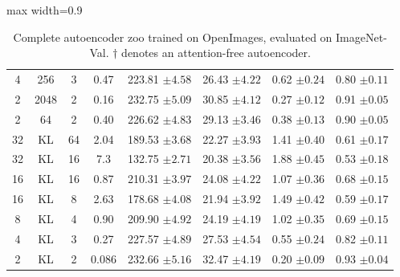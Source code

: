 {\begin{table}[thbp]
\begin{center}
\begin{footnotesize}
\begin{adjustbox}{max width=0.9\textwidth}
\begin{tabular}{c c c c c c c c}
%
%
%
%
 4 & 256 & 3 & 0.47 & 223.81 \tiny{$\pm4.58$} & 26.43 \tiny{$\pm4.22$} & 0.62 \tiny{$\pm0.24$} & 0.80 \tiny{$\pm0.11$} \\
2 & 2048 & 2 & 0.16 & 232.75 \tiny{$\pm5.09$} & 30.85 \tiny{$\pm4.12$} & 0.27 \tiny{$\pm0.12$} & 0.91 \tiny{$\pm0.05$} \\
2 & 64 & 2 & 0.40 & 226.62 \tiny{$\pm4.83$} & 29.13 \tiny{$\pm3.46$} & 0.38 \tiny{$\pm0.13$} & 0.90 \tiny{$\pm0.05$} \\
\midrule
32 & KL & 64 & 2.04 & 189.53 \tiny{$\pm3.68$} & 22.27 \tiny{$\pm3.93$} & 1.41 \tiny{$\pm0.40$} & 0.61 \tiny{$\pm0.17$} \\
32 & KL & 16 & 7.3 & 132.75 \tiny{$\pm2.71$} & 20.38 \tiny{$\pm3.56$} & 1.88 \tiny{$\pm0.45$} & 0.53 \tiny{$\pm0.18$} \\
16 & KL & 16 & 0.87 & 210.31 \tiny{$\pm3.97$} & 24.08 \tiny{$\pm4.22$} & 1.07 \tiny{$\pm0.36$} & 0.68 \tiny{$\pm0.15$} \\
16 & KL & 8 & 2.63 & 178.68 \tiny{$\pm4.08$} & 21.94 \tiny{$\pm3.92$} & 1.49 \tiny{$\pm0.42$} & 0.59 \tiny{$\pm0.17$} \\
8  & KL & 4 & 0.90 & 209.90 \tiny{$\pm4.92$} & 24.19 \tiny{$\pm4.19$} & 1.02 \tiny{$\pm0.35$} & 0.69 \tiny{$\pm0.15$} \\
4  & KL & 3 & 0.27 & 227.57 \tiny{$\pm4.89$} & 27.53 \tiny{$\pm4.54$} & 0.55 \tiny{$\pm0.24$} & 0.82 \tiny{$\pm0.11$} \\
2  & KL & 2 & 0.086 & 232.66 \tiny{$\pm5.16$} & 32.47 \tiny{$\pm4.19$} & 0.20 \tiny{$\pm0.09$} & 0.93 \tiny{$\pm0.04$} \\
        \bottomrule 
%
      \end{tabular}  
      \end{adjustbox}
            \caption{\label{tab:firststagetablecomplete} Complete autoencoder zoo trained on OpenImages, evaluated on ImageNet-Val. $\dagger$ denotes an attention-free autoencoder. \vspace{-1em}}
      	\end{footnotesize}
    \end{center}
  \end{table}
}


